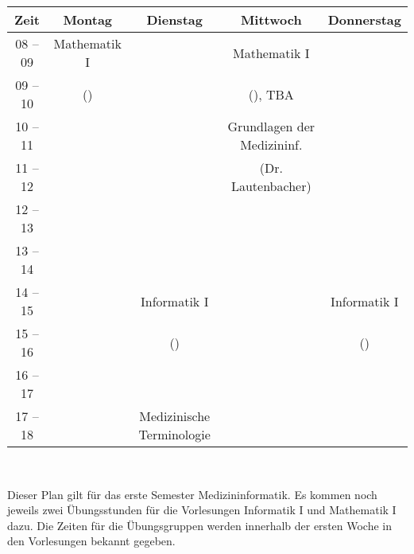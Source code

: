 \begin{minipage}{\textwidth}
    \footnotesize
\begin{center}
\begin{tabular}{|c|c|c|c|c|} 
	\hline
	Zeit    & Montag       & Dienstag             & Mittwoch                          & Donnerstag                          \\ 
	\hline\hline
	08 – 09 & Mathematik I &                      & Mathematik I                      &                                   \\ 
	\cline{1-1}\cline{3-3}\cline{5-5}
	09 – 10 & (\Matheprof)      &                      & (\Matheprof), TBA                           &   \\ 
	\hline
	10 – 11 &              &                      &     Grundlagen der Medizininf.                              &                                   \\ 
	\cline{1-1}\cline{3-5}
	11 – 12 &              &                      &    (Dr. Lautenbacher)             &                                   \\ 
	\hline
	12 – 13 &              &                      &                                   &                                   \\ 
	\hline
	13 – 14 &              &                      &                                   &                                   \\ 
	\hline
	14 – 15 &              & Informatik I  &  &      Informatik I                             \\ 
	\cline{1-2}\cline{4-5}
	15 – 16 &              & (\Infoprof)              &          &  (\Infoprof)                \\ 
	\cline{1-3}\cline{5-5}
	16 – 17 &              &                      &                                   &                                   \\ 
	\hline
	17 – 18 &              &   Medizinische Terminologie    &  &                                   \\
	\hline
\end{tabular}
    ~\\
\scriptsize %
\end{center}
\end{minipage}
Dieser Plan gilt für das erste Semester Medizininformatik. Es kommen noch jeweils zwei Übungsstunden für die Vorlesungen 
Informatik I und Mathematik I dazu. Die Zeiten für die Übungsgruppen werden innerhalb der ersten Woche in den Vorlesungen bekannt gegeben.
